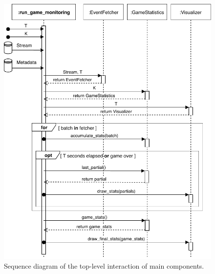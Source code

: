 \documentclass[a4paper, 11pt]{article}
\begin{document}
\begin{figure}[h]
    \centering
    \includegraphics[height=.85\textheight]{UML/top_level_seq.pdf}
    \caption{Sequence diagram of the top-level interaction of main components.}
    \label{fig:top_level_seq}
\end{figure}
\end{document}
